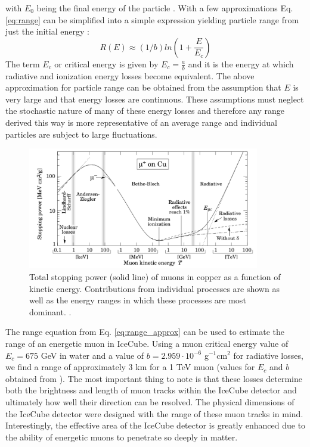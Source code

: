 \documentclass{gatech-thesis}
\begin{document}
with $E_0$ being the final energy of the particle \cite{2001ADNDT..78..183G}.
With a few approximations Eq. \ref{eq:range} can be simplified into a simple expression yielding particle range from just the initial energy \cite{2001ADNDT..78..183G}:
\begin{equation}\label{eq:range_approx}
R(E) \approx (1/b)ln(1+\frac{E}{E_{c}})
\end{equation}
The term $E_{c}$ or critical energy is given by $E_{c}=\frac{a}{b}$ and it is the energy at which radiative and ionization energy losses become equivalent. The above approximation for particle range can be obtained from the assumption that $E$ is very large and that energy losses are continuous. These assumptions must neglect the stochastic nature of many of these energy losses and therefore any range derived this way is more representative of an average range and individual particles are subject to large fluctuations.

\begin{figure}[ht]
  \begin{center}
    \includegraphics[width=0.9\textwidth,keepaspectratio]{MuonStoppingPower.png}
  \end{center}
  \caption{Total stopping power (solid line) of muons in copper as a function of kinetic energy. Contributions from individual processes are shown as well as the energy ranges in which these processes are most dominant. \cite{2001ADNDT..78..183G}.}
  \label{fig:MuonStoppingPower}
\end{figure}

The range equation from Eq. \ref{eq:range_approx} can be used to estimate the range of an energetic muon in IceCube. Using a muon critical energy value of $E_{c}=675$ GeV in water and a value of $b=2.959 \cdot 10^{-6}$ g$^{-1}$cm$^{2}$ for radiative losses, we find a range of approximately 3 km for a 1 TeV muon (values for $E_{c}$ and $b$ obtained from \cite{2001ADNDT..78..183G}). The most important thing to note is that these losses determine both the brightness and length of muon tracks within the IceCube detector and ultimately how well their direction can be resolved. The physical dimensions of the IceCube detector were designed with the range of these muon tracks in mind. Interestingly, the effective area of the IceCube detector is greatly enhanced due to the ability of energetic muons to penetrate so deeply in matter.
\end{document}
